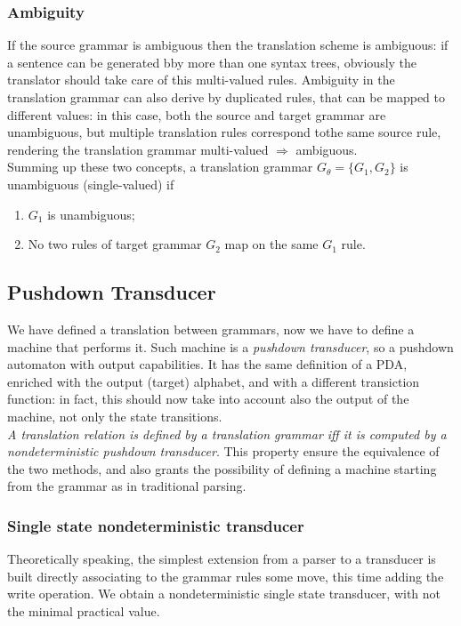 			\subsubsection{Ambiguity}
				If the source grammar is ambiguous then the translation scheme is ambiguous: if a sentence can be generated bby more than one syntax trees, obviously the translator should take care of this multi-valued rules. Ambiguity in the translation grammar can also derive by duplicated rules, that can be mapped to different values: in this case, both the source and target grammar are unambiguous, but multiple translation rules correspond tothe same source rule, rendering the translation grammar multi-valued $\Rightarrow$ ambiguous.\\
				Summing up these two concepts, a translation grammar $ G_\theta = \{ G_1 , G_2\}$ is unambiguous (single-valued) if 
				\begin{enumerate}
					\item $G_1$ is unambiguous;
					\item No two rules of target grammar $G_2$ map on the same $G_1$ rule.
				\end{enumerate}
		
		\subsection{Pushdown Transducer}
			We have defined a translation between grammars, now we have to define a machine that performs it. Such machine is a \emph{pushdown transducer}, so a pushdown automaton with output capabilities. It has the same definition of a PDA, enriched with the output (target) alphabet, and with a different transiction function: in fact, this should now take into account also the output of the machine, not only the state transitions.\\
			\emph{A translation relation is defined by a translation grammar iff it is computed by a nondeterministic pushdown transducer}. This property ensure the equivalence of the two methods, and also grants the possibility of defining a machine starting from the grammar as in traditional parsing. 
			
			\subsubsection{Single state nondeterministic transducer}
				Theoretically speaking, the simplest extension from a parser to a transducer is built directly associating to the grammar rules some move, this time adding the write operation. We obtain a nondeterministic single state transducer, with not the minimal practical value.
			
